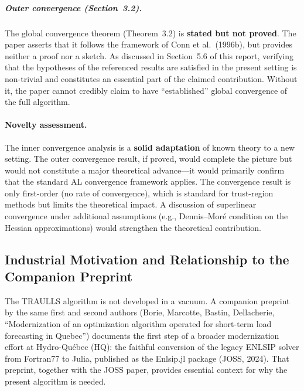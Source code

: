 \documentclass[11pt]{article}
\theoremstyle{plain}
\begin{document}
\subparagraph{Outer convergence (Section~3.2).} The global convergence theorem (Theorem~3.2) is \textbf{stated but not proved}. The paper asserts that it follows the framework of Conn et al.\ (1996b), but provides neither a proof nor a sketch. As discussed in Section~5.6 of this report, verifying that the hypotheses of the referenced results are satisfied in the present setting is non-trivial and constitutes an essential part of the claimed contribution. Without it, the paper cannot credibly claim to have ``established'' global convergence of the full algorithm.

\paragraph{Novelty assessment.} The inner convergence analysis is a \textbf{solid adaptation} of known theory to a new setting. The outer convergence result, if proved, would complete the picture but would not constitute a major theoretical advance---it would primarily confirm that the standard AL convergence framework applies. The convergence result is only first-order (no rate of convergence), which is standard for trust-region methods but limits the theoretical impact. A discussion of superlinear convergence under additional assumptions (e.g., Dennis--Mor\'e condition on the Hessian approximations) would strengthen the theoretical contribution.

\subsection{Industrial Motivation and Relationship to the Companion Preprint}

The TRAULLS algorithm is not developed in a vacuum. A companion preprint by the same first and second authors (Borie, Marcotte, Bastin, Dellacherie, ``Modernization of an optimization algorithm operated for short-term load forecasting in Quebec'') documents the first step of a broader modernization effort at Hydro-Qu\'ebec (HQ): the faithful conversion of the legacy ENLSIP solver from Fortran77 to Julia, published as the Enlsip.jl package (JOSS, 2024). That preprint, together with the JOSS paper, provides essential context for why the present algorithm is needed.
\end{document}
